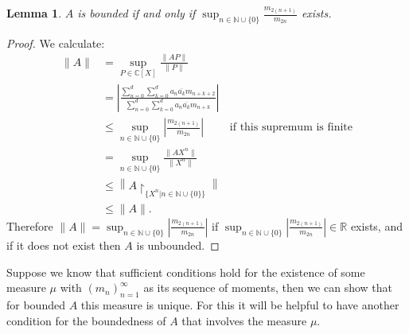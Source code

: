 \documentclass[12pt,oneside]{report}
\newtheorem{lem}[thm]{Lemma}
\begin{document}
\begin{lem}\label{A-bound}
    $A$ is bounded if and only if $\sup_{n \in \mathbb{N} \cup \{ 0 \}}\frac{m_{2(n+1)}}{m_{2n}}$ exists.
\end{lem}
\begin{proof}
    We calculate:
    \begin{align*}
        \|A\| &= \sup_{P \in \mathbb{C}[X]} \frac{\|AP\|}{\|P\|} \\
        &= \left|\frac{\sum_{n=0}^{d}\sum_{k=0}^{d}a_{n}\overline{a_{k}}m_{n+k+2}}{\sum_{n=0}^{d}\sum_{k=0}^{d}a_{n}\overline{a_{k}}m_{n+k}}\right| \\
        &\leq \sup_{n \in \mathbb{N} \cup \{ 0 \}} \left|\frac{m_{2(n+1)}}{m_{2n}}\right| & \text{if this supremum is finite} \\
        &= \sup_{n \in \mathbb{N} \cup \{ 0 \}} \frac{\|AX^{n}\|}{\|X^{n}\|} \\
        &\leq \left\|A\restriction_{\{ X^{n} | n \in \mathbb{N} \cup \{ 0 \} \}}\right\| \\
        &\leq \|A\|.
    \end{align*}
    Therefore $\|A\| = \sup_{n \in \mathbb{N} \cup \{ 0 \}} \left|\frac{m_{2(n+1)}}{m_{2n}}\right|$ if $\sup_{n \in \mathbb{N} \cup \{ 0 \}} \left|\frac{m_{2(n+1)}}{m_{2n}}\right| \in \mathbb{R}$ exists, and if it does not exist then $A$ is unbounded.
\end{proof}

Suppose we know that sufficient conditions hold for the existence of some measure $\mu$ with $(m_{n})_{n=1}^{\infty}$ as its sequence of moments, then we can show that for bounded $A$ this measure is unique. For this it will be helpful to have another condition for the boundedness of $A$ that involves the measure $\mu$.
\end{document}
